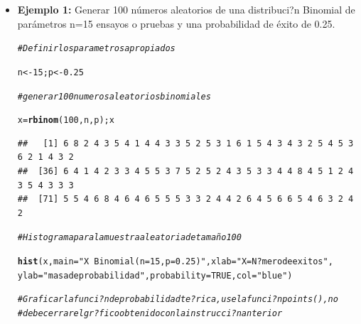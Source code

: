 \documentclass[12pt,letterpaper]{article}\usepackage[]{graphicx}\usepackage[]{color}
\makeatletter
\newcommand{\hlnum}[1]{\textcolor[rgb]{0.686,0.059,0.569}{#1}}%
\newcommand{\hlstr}[1]{\textcolor[rgb]{0.192,0.494,0.8}{#1}}%
\newcommand{\hlcom}[1]{\textcolor[rgb]{0.678,0.584,0.686}{\textit{#1}}}%
\newcommand{\hlstd}[1]{\textcolor[rgb]{0.345,0.345,0.345}{#1}}%
\newcommand{\hlkwb}[1]{\textcolor[rgb]{0.69,0.353,0.396}{#1}}%
\newcommand{\hlkwc}[1]{\textcolor[rgb]{0.333,0.667,0.333}{#1}}%
\newcommand{\hlkwd}[1]{\textcolor[rgb]{0.737,0.353,0.396}{\textbf{#1}}}%
\newenvironment{kframe}{%
 \def\at@end@of@kframe{}%
 \ifinner\ifhmode%
  \def\at@end@of@kframe{\end{minipage}}%
  \begin{minipage}{\columnwidth}%
 \fi\fi%
 \def\FrameCommand##1{\hskip\@totalleftmargin \hskip-\fboxsep
 \colorbox{shadecolor}{##1}\hskip-\fboxsep
     \hskip-\linewidth \hskip-\@totalleftmargin \hskip\columnwidth}%
 \MakeFramed {\advance\hsize-\width
   \@totalleftmargin\z@ \linewidth\hsize
   \@setminipage}}%
 {\par\unskip\endMakeFramed%
 \at@end@of@kframe}
\newenvironment{knitrout}{}{} %
\makeatother
\begin{document}
\begin{itemize}
\item \textbf{Ejemplo 1:} Generar 100 n\'umeros aleatorios de una distribuci?n Binomial de par\'ametros n=15 ensayos o pruebas y una probabilidad de \'exito de 0.25.

\begin{knitrout}
\color{fgcolor}\begin{kframe}
\begin{alltt}
\hlcom{# Definir los parametros apropiados}

\hlstd{n} \hlkwb{<-} \hlnum{15}\hlstd{; p} \hlkwb{<-} \hlnum{0.25}

\hlcom{# generar 100 numeros aleatorios binomiales}

\hlstd{x} \hlkwb{=} \hlkwd{rbinom}\hlstd{(}\hlnum{100}\hlstd{, n, p); x}
\end{alltt}
\begin{verbatim}
##   [1] 6 8 2 4 3 5 4 1 4 4 3 3 5 2 5 3 1 6 1 5 4 3 4 3 2 5 4 5 3 6 2 1 4 3 2
##  [36] 6 4 1 4 2 3 3 4 5 5 3 7 5 2 5 2 4 3 5 3 3 4 4 8 4 5 1 2 4 3 5 4 3 3 3
##  [71] 5 5 4 6 8 4 6 4 6 5 5 5 3 3 2 4 4 2 6 4 5 6 6 5 4 6 3 2 4 2
\end{verbatim}
\begin{alltt}
\hlcom{# Histograma para la muestra aleatoria de tamaño 100}

\hlkwd{hist}\hlstd{(x,} \hlkwc{main}\hlstd{=}\hlstr{"X ~ Binomial(n=15, p=0.25)"}\hlstd{,} \hlkwc{xlab}\hlstd{=}\hlstr{"X = N?mero de exitos"}\hlstd{,}
\hlkwc{ylab}\hlstd{=}\hlstr{"masa de probabilidad"}\hlstd{,} \hlkwc{probability}\hlstd{=}\hlnum{TRUE}\hlstd{,} \hlkwc{col}\hlstd{=}\hlstr{"blue"}\hlstd{)}

\hlcom{# Graficar la funci?n de probabilidad te?rica, use la funci?n points(), no }
\hlcom{# debe cerrar el gr?fico obtenido con la instrucci?n anterior}


\end{alltt}
\end{kframe}
\end{knitrout}
\end{itemize}
\end{document}
